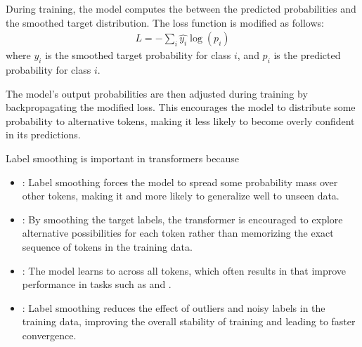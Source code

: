 \documentclass[letterpaper,11pt,english]{sphinxmanual}
\begin{document}
\sphinxAtStartPar
During training, the model computes the  between
the predicted probabilities and the smoothed target distribution. The
loss function is modified as follows:
\begin{equation*}
\begin{split}L = -\sum_i{\hat{y_i} \log(p_i)}\end{split}
\end{equation*}
\sphinxAtStartPar
where \(\hat{y_i}\) is the smoothed target probability for class
\(i\), and \(p_i\) is the predicted probability for class
\(i\).

\sphinxAtStartPar
The model’s output probabilities are then adjusted during training by
backpropagating the modified loss. This encourages the model to
distribute some probability to alternative tokens, making it less likely
to become overly confident in its predictions.

\sphinxAtStartPar
Label smoothing is important in transformers because
\begin{itemize}
\item {} 
\sphinxAtStartPar
{}: Label smoothing forces the model to spread
some probability mass over other tokens, making it  and more likely to generalize well to unseen data.

\item {} 
\sphinxAtStartPar
{}: By smoothing the target labels, the
transformer is encouraged to explore alternative possibilities for
each token rather than memorizing the exact sequence of tokens in the
training data.

\item {} 
\sphinxAtStartPar
{}: The model learns to  across all tokens, which often results in
 that improve performance in tasks
such as  and .

\item {} 
\sphinxAtStartPar
{}: Label smoothing reduces the effect of outliers
and noisy labels in the training data, improving the overall stability
of training and leading to faster convergence.

\end{itemize}
\end{document}
